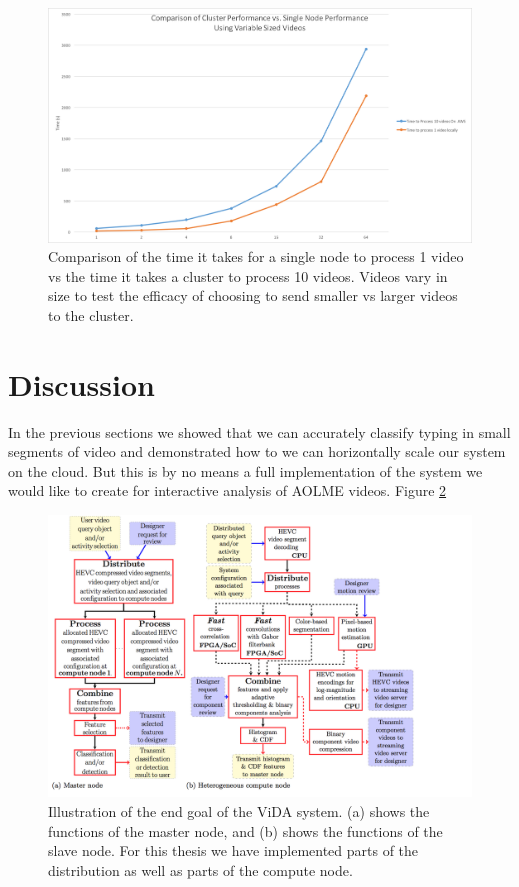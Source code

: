 \begin{figure}[h]
  \centering
  \includegraphics[width=\textwidth]{figures/size_matters}
  \caption{Comparison of the time it takes for a single node to process 1 video
  vs the time it takes a cluster to process 10 videos. Videos vary in size to
  test the efficacy of choosing to send smaller vs larger videos to the cluster.}
  \label{fig:size_matters}
\end{figure}

\section{Discussion}
 In the previous sections we showed that we can accurately classify typing in
 small segments of video and demonstrated how to we can horizontally scale our
 system on the cloud. But this is by no means a full implementation of the system
 we would like to create for interactive analysis of AOLME videos. Figure
 \ref{fig:full_system}

 \begin{figure}[h]
   \label{fig:full_system}
   \centering
   \includegraphics[width=\textwidth]{figures/full_system}
   \caption{Illustration of the end goal of the ViDA system. (a) shows the
   functions of the master node, and (b) shows the functions of the slave node.
   For this thesis we have implemented parts of the distribution as well as parts
   of the compute node.}
 \end{figure}

